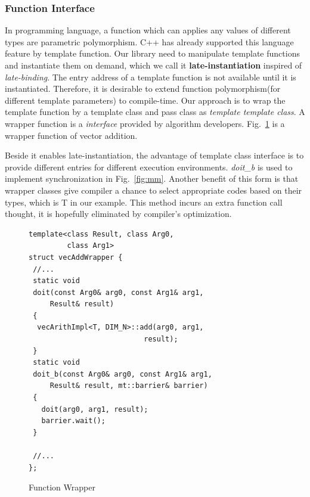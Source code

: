 \documentclass[10pt, conference, compsocconf]{IEEEtran}
\begin{document}
\subsubsection{Function Interface}
In programming language, a function which can applies any values of
different types are parametric polymorphism. C++ has already supported
this language feature by template function. Our library need to
manipulate template functions and instantiate them on demand, which we
call it \textbf{late-instantiation} inspired of \emph{late-binding}. The entry address of a template function is not available until it is
instantiated. Therefore, it is desirable to extend function
polymorphism(for different template parameters)  to compile-time. Our
approach is to wrap the template function by a template class and pass
class as \emph{template template class}. A wrapper function is
a \emph{interface} provided by algorithm developers. Fig.~\ref{lst:wrapper} is a wrapper function of vector addition. 

Beside it enables late-instantiation, the advantage of template class interface
is to provide different entries for different execution environments. \emph{doit\_b} is
used to implement synchronization in Fig.~\ref{fig:mm}.  Another benefit of
this form is that wrapper classes  give compiler a chance to select
appropriate codes based on their types, which is T in our example. This method incurs an extra function call  thought, it is hopefully  eliminated by
compiler's optimization.

\begin{figure}[!htp]
\begin{minipage}[tb]{\linewidth}
\makebox[\textwidth]{\hrulefill}
\begin{small}
\begin{verbatim}
template<class Result, class Arg0, 
         class Arg1>
struct vecAddWrapper {
 //...
 static void 
 doit(const Arg0& arg0, const Arg1& arg1, 
     Result& result)
 {
  vecArithImpl<T, DIM_N>::add(arg0, arg1, 
                           result);
 }
 static void 
 doit_b(const Arg0& arg0, const Arg1& arg1, 
     Result& result, mt::barrier& barrier)
 {
   doit(arg0, arg1, result);
   barrier.wait();
 }

 //...
};
\end{verbatim}
\end{small}
\makebox[\textwidth]{\hrulefill}
\end{minipage}
\caption{Function Wrapper}\label{lst:wrapper}
\end{figure}
\end{document}
